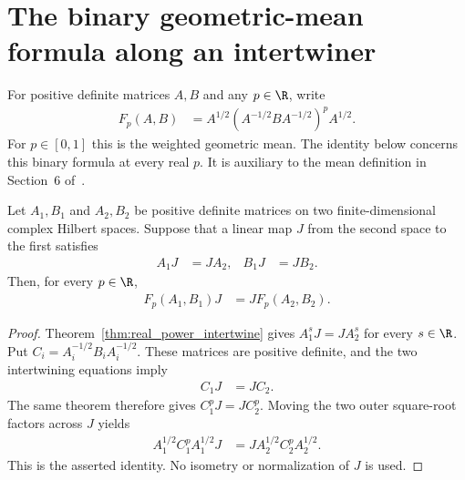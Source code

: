 \section{The binary geometric-mean formula along an intertwiner}
\label{sec:geometric_mean_value_intertwine}

For positive definite matrices $A,B$ and any $p\in\R$, write
\begin{align}
  F_p(A,B)&=A^{1/2}(A^{-1/2}BA^{-1/2})^pA^{1/2}.
\end{align}
For $p\in[0,1]$ this is the weighted geometric mean. The identity
below concerns this binary formula at every real $p$.
It is auxiliary to the mean definition in Section~6
of~\cite{OpenAI2026AreaLaw}.

\begin{theorem}
  \label{thm:geometric_mean_value_intertwine}
  \leanok
  Let $A_1,B_1$ and $A_2,B_2$ be positive definite matrices on two
  finite-dimensional complex Hilbert spaces. Suppose that a linear map
  $J$ from the second space to the first satisfies
  \begin{align}
    A_1J&=JA_2,& B_1J&=JB_2.
  \end{align}
  Then, for every $p\in\R$,
  \begin{align}
    F_p(A_1,B_1)J&=JF_p(A_2,B_2).
  \end{align}
\end{theorem}

\begin{proof}
  \leanok
  Theorem~\ref{thm:real_power_intertwine} gives $A_1^sJ=JA_2^s$
  for every $s\in\R$. Put $C_i=A_i^{-1/2}B_iA_i^{-1/2}$.
  These matrices are positive definite, and the two intertwining
  equations imply
  \begin{align}
    C_1J&=JC_2.
  \end{align}
  The same theorem therefore gives $C_1^pJ=JC_2^p$. Moving the two
  outer square-root factors across $J$ yields
  \begin{align}
    A_1^{1/2}C_1^pA_1^{1/2}J
      &=JA_2^{1/2}C_2^pA_2^{1/2}.
  \end{align}
  This is the asserted identity. No isometry or normalization of $J$
  is used.
\end{proof}
